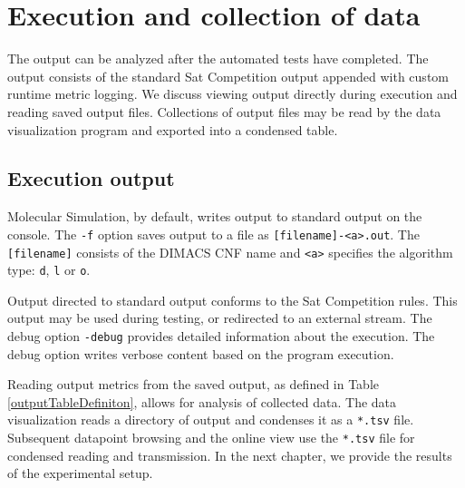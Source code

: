 \FloatBarrier


	\section{Execution and collection of data}


The output can be analyzed after the automated tests have completed.  The output consists of the standard {\sc Sat} Competition output appended with custom runtime metric logging.  We discuss viewing output directly during execution and reading saved output files.  Collections of output files may be read by the data visualization program and exported into a condensed table. 

		\subsection{Execution output}


	Molecular Simulation, by default, writes output to standard output on the console.  The \texttt{-f} option saves output to a file as \texttt{[filename]-<a>.out}.  The \texttt{[filename]} consists of the DIMACS CNF name and \texttt{<a>} specifies the algorithm type: \texttt{d}, \texttt{l} or \texttt{o}.

	Output directed to standard output conforms to the {\sc Sat} Competition rules.  This output may be used during testing, or redirected to an external stream.  The debug option \texttt{-debug} provides detailed information about the execution.  The debug option writes verbose content based on the program execution.  

	Reading output metrics from the saved output, as defined in Table \ref{outputTableDefiniton}, allows for analysis of collected data.  The data visualization reads a directory of output and condenses it as a \texttt{*.tsv} file.  Subsequent datapoint browsing and the online view use the \texttt{*.tsv} file for condensed reading and transmission.  In the next chapter, we provide the results of the experimental setup.
